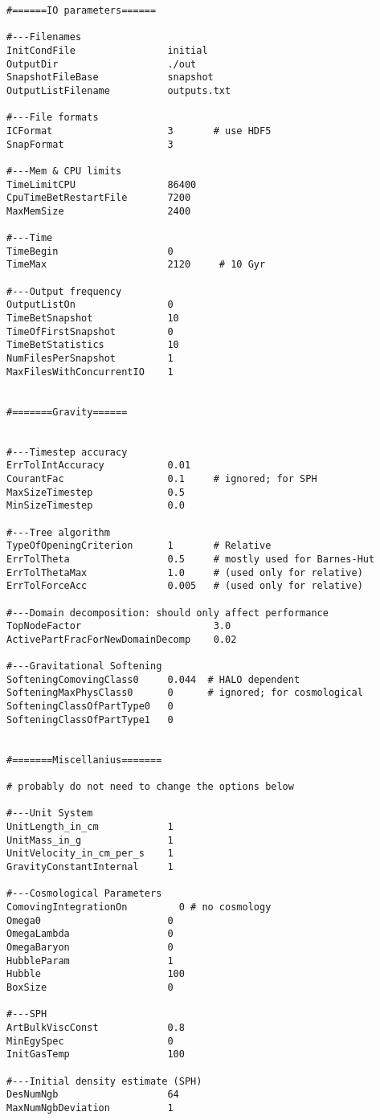\begin{verbatim}
#======IO parameters======

#---Filenames
InitCondFile                initial
OutputDir                   ./out
SnapshotFileBase            snapshot
OutputListFilename          outputs.txt

#---File formats 
ICFormat                    3       # use HDF5
SnapFormat                  3 

#---Mem & CPU limits
TimeLimitCPU                86400
CpuTimeBetRestartFile       7200
MaxMemSize                  2400

#---Time
TimeBegin                   0
TimeMax                     2120     # 10 Gyr

#---Output frequency
OutputListOn                0
TimeBetSnapshot             10
TimeOfFirstSnapshot         0 
TimeBetStatistics           10
NumFilesPerSnapshot         1
MaxFilesWithConcurrentIO    1 


#=======Gravity======


#---Timestep accuracy
ErrTolIntAccuracy           0.01
CourantFac                  0.1     # ignored; for SPH
MaxSizeTimestep             0.5
MinSizeTimestep             0.0 

#---Tree algorithm
TypeOfOpeningCriterion      1       # Relative
ErrTolTheta                 0.5     # mostly used for Barnes-Hut
ErrTolThetaMax              1.0     # (used only for relative)
ErrTolForceAcc              0.005   # (used only for relative)

#---Domain decomposition: should only affect performance
TopNodeFactor                       3.0
ActivePartFracForNewDomainDecomp    0.02

#---Gravitational Softening
SofteningComovingClass0     0.044  # HALO dependent
SofteningMaxPhysClass0      0      # ignored; for cosmological
SofteningClassOfPartType0   0
SofteningClassOfPartType1   0


#=======Miscellanius=======

# probably do not need to change the options below 

#---Unit System
UnitLength_in_cm            1 
UnitMass_in_g               1
UnitVelocity_in_cm_per_s    1 
GravityConstantInternal     1

#---Cosmological Parameters 
ComovingIntegrationOn         0 # no cosmology
Omega0                      0
OmegaLambda                 0 
OmegaBaryon                 0
HubbleParam                 1
Hubble                      100
BoxSize                     0

#---SPH
ArtBulkViscConst            0.8
MinEgySpec                  0
InitGasTemp                 100

#---Initial density estimate (SPH)
DesNumNgb                   64
MaxNumNgbDeviation          1
\end{verbatim}
